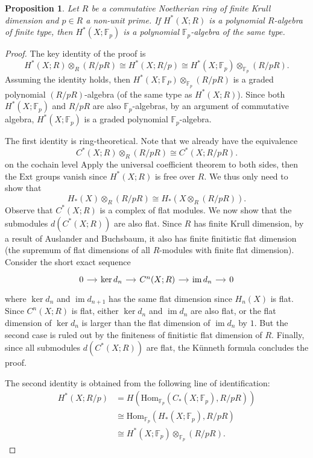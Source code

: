 \documentclass[psamsfonts]{amsart}
\newtheorem{prop}{Proposition}[section]
\theoremstyle{definition}
\newcommand{\Hom}{\mathrm{Hom}}
\newcommand{\F}{\mathbb{F}}
\DeclareMathOperator{\im}{im}
\numberwithin{equation}{section}
\begin{document}
\begin{prop}
Let $R$ be a commutative Noetherian ring of finite Krull dimension and $p\in R$ a non-unit prime. If $H^\ast(X;R)$ is a polynomial $R$-algebra of finite type, then $H^\ast(X;\F_p)$ is a polynomial $\F_p$-algebra of the same type.
\end{prop}
\begin{proof}
The key identity of the proof is
\begin{equation} H^\ast(X;R)\otimes_R (R/pR)\cong H^\ast(X;R/p)\cong H^\ast(X;\F_p)\otimes_{\F_p}(R/pR).
\end{equation}
Assuming the identity holds, then $H^\ast(X;\F_P)\otimes_{\F_p}(R/pR)$ is a graded polynomial $(R/pR)$-algebra (of the same type as $H^\ast(X;R)$). Since both $H^\ast(X;\F_p)$ and $R/pR$ are also $\F_p$-algebras, by an argument of commutative algebra, $H^\ast(X;\F_p)$ is a graded polynomial $\F_p$-algebra.\medbreak

The first identity is ring-theoretical. Note that we already have the equivalence 
\[C^\ast(X;R)\otimes_R(R/pR)\cong C^\ast(X;R/pR).\]
on the cochain level
Apply the universal coefficient theorem to both sides, then the $\mathrm{Ext}$ groups vanish since $H^\ast(X;R)$ is free over $R$. We thus only need to show that
\[H_\ast(X)\otimes_R(R/pR)\cong H_\ast(X\otimes_R(R/pR)).\]
Observe that $C^\ast(X;R)$ is a complex of flat modules. We now show that the submodules $d(C^\ast(X;R))$ are also flat. Since $R$ has finite Krull dimension, by a result of Auslander and Buchsbaum, it also has finite finitistic flat dimension (the supremum of flat dimensions of all $R$-modules with finite flat dimension). Consider the short exact sequence
\[\begin{tikzcd}[column sep=small]
0\arrow[r]&\ker d_n\arrow[r]& C^n(X;R)\arrow[r]&\im d_n\arrow[r]&0
\end{tikzcd}\]
where $\ker d_n$ and $\im d_{n+1}$ has the same flat dimension since $H_n(X)$ is flat. Since $C^n(X;R)$ is flat, either $\ker d_n$ and $\im d_n$ are also flat, or the flat dimension of $\ker d_n$ is larger than the flat dimension of $\im d_n$ by $1$. But the second case is ruled out by the finiteness of finitistic flat dimension of $R$. Finally, since all submodules $d(C^\ast(X;R))$ are flat, the Künneth formula concludes the proof.\medbreak

The second identity is obtained from the following line of identification:
\begin{align*}
H^\ast(X;R/p)&=H(\Hom_{\F_p}(C_\ast(X;\F_p),R/pR))\\
&\cong\Hom_{\F_p}(H_\ast(X;\F_p),R/pR)\\
&\cong H^\ast(X;\F_p)\otimes_{\F_p}(R/pR).
\end{align*}
\end{proof}
\end{document}
